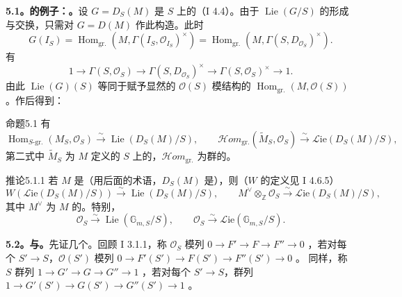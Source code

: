 \textbf{5.1。的例子：。}设 $G=D_S(M)$ 是 $S$ 上的（I 4.4）。由于 $\operatorname{Lie}(G/S)$ 的形成与交换，只需对 $G=D(M)$ 作此构造。此时
\[G(I_S)=\operatorname{Hom}_{\mathrm{gr.}}(M,\Gamma(I_S,\mathcal O_{I_S})^\times)=\operatorname{Hom}_{\mathrm{gr.}}(M,\Gamma(S,D_{\mathcal O_S})^\times).\]
有
\[1\to\Gamma(S,\mathcal O_S)\to\Gamma(S,D_{\mathcal O_S})^\times\to\Gamma(S,\mathcal O_S)^\times\to1.\]
由此 $\operatorname{Lie}(G)(S)$ 等同于赋予显然的 $\mathcal O(S)$ 模结构的 $\operatorname{Hom}_{\mathrm{gr.}}(M,\mathcal O(S))$。作后得到：
\begin{SGAresult}{命题}{5.1}
有
\[\operatorname{Hom}_{S\text{-gr.}}(M_S,\mathcal O_S)\xrightarrow{\sim}\operatorname{Lie}(D_S(M)/S),\qquad\mathcal Hom_{\mathrm{gr.}}(\widetilde M_S,\mathcal O_S)\xrightarrow{\sim}\mathscr{L}\mathrm{ie}(D_S(M)/S),\]
第二式中 $\widetilde M_S$ 为 $M$ 定义的 $S$ 上的，$\mathcal Hom_{\mathrm{gr.}}$ 为群的。
\end{SGAresult}
\begin{SGAresult}{推论}{5.1.1}
若 $M$ 是（用后面的术语，$D_S(M)$ 是），则（$W$ 的定义见 I 4.6.5）
\[W(\mathscr{L}\mathrm{ie}(D_S(M)/S))\xrightarrow{\sim}\operatorname{Lie}(D_S(M)/S),\qquad M^\vee\otimes_{\mathbb Z}\mathcal O_S\xrightarrow{\sim}\mathscr{L}\mathrm{ie}(D_S(M)/S),\]
其中 $M^\vee$ 为 $M$ 的。特别，
\[\mathcal O_S\xrightarrow{\sim}\operatorname{Lie}(\mathbb G_{m,S}/S),\qquad\mathcal O_S\xrightarrow{\sim}\mathscr{L}\mathrm{ie}(\mathbb G_{m,S}/S).\]
\end{SGAresult}
\textbf{5.2。与。}先证几个。回顾 I 3.1.1，称 $\mathcal O_S$ 模列 $0\to F'\to F\to F''\to0$ ，若对每个 $S'\to S$，$\mathcal O(S')$ 模列 $0\to F'(S')\to F(S')\to F''(S')\to0$ 。
同样，称 $S$ 群列 $1\to G'\to G\to G''\to1$ ，若对每个 $S'\to S$，群列 $1\to G'(S')\to G(S')\to G''(S')\to1$ 。
